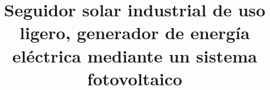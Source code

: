 \documentclass[letterpaper,10pt]{upiita}
\title{Seguidor solar industrial de uso ligero, generador de energía eléctrica mediante un sistema fotovoltaico}
\begin{document}
\renewcommand{\tablename}{Tabla}
\renewcommand{\figurename}{Figura}
\makeatletter {}\makeatother
\frontmatter
\portada                  %
\acta                     %
\cambiamargen              %
\dedicatoria              %
\agradecimientos          %
\tabladecontenido
\listadefiguras
\listadetablas
\mainmatter
\inicial
\media



%


\newpage
%
\printbibliography
\backmatter
\end{document}

